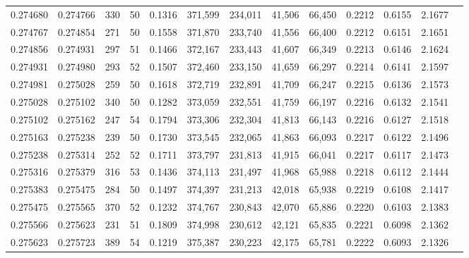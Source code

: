 \begin{tabular}{rrrrrrrrrrrrr}
0.274680 & 0.274766 &   330 &  50 &                                     0.1316 & 371,599 & 234,011 &  41,506 &  66,450 & 0.2212 & 0.6155 & 2.1677 \\
0.274767 & 0.274854 &   271 &  50 &                                     0.1558 & 371,870 & 233,740 &  41,556 &  66,400 & 0.2212 & 0.6151 & 2.1651 \\
0.274856 & 0.274931 &   297 &  51 &                                     0.1466 & 372,167 & 233,443 &  41,607 &  66,349 & 0.2213 & 0.6146 & 2.1624 \\
0.274931 & 0.274980 &   293 &  52 &                                     0.1507 & 372,460 & 233,150 &  41,659 &  66,297 & 0.2214 & 0.6141 & 2.1597 \\
0.274981 & 0.275028 &   259 &  50 &                                     0.1618 & 372,719 & 232,891 &  41,709 &  66,247 & 0.2215 & 0.6136 & 2.1573 \\
0.275028 & 0.275102 &   340 &  50 &                                     0.1282 & 373,059 & 232,551 &  41,759 &  66,197 & 0.2216 & 0.6132 & 2.1541 \\
0.275102 & 0.275162 &   247 &  54 &                                     0.1794 & 373,306 & 232,304 &  41,813 &  66,143 & 0.2216 & 0.6127 & 2.1518 \\
0.275163 & 0.275238 &   239 &  50 &                                     0.1730 & 373,545 & 232,065 &  41,863 &  66,093 & 0.2217 & 0.6122 & 2.1496 \\
0.275238 & 0.275314 &   252 &  52 &                                     0.1711 & 373,797 & 231,813 &  41,915 &  66,041 & 0.2217 & 0.6117 & 2.1473 \\
0.275316 & 0.275379 &   316 &  53 &                                     0.1436 & 374,113 & 231,497 &  41,968 &  65,988 & 0.2218 & 0.6112 & 2.1444 \\
0.275383 & 0.275475 &   284 &  50 &                                     0.1497 & 374,397 & 231,213 &  42,018 &  65,938 & 0.2219 & 0.6108 & 2.1417 \\
0.275475 & 0.275565 &   370 &  52 &                                     0.1232 & 374,767 & 230,843 &  42,070 &  65,886 & 0.2220 & 0.6103 & 2.1383 \\
0.275566 & 0.275623 &   231 &  51 &                                     0.1809 & 374,998 & 230,612 &  42,121 &  65,835 & 0.2221 & 0.6098 & 2.1362 \\
0.275623 & 0.275723 &   389 &  54 &                                     0.1219 & 375,387 & 230,223 &  42,175 &  65,781 & 0.2222 & 0.6093 & 2.1326 \\

\end{tabular}

